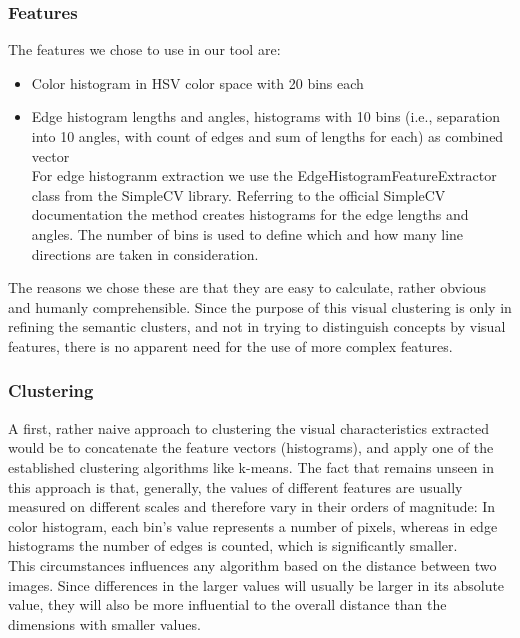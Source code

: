 \subsubsection{Features}
The features we chose to use in our tool are:
\begin{itemize}
\item{Color histogram} in HSV color space with 20 bins each
\item{Edge histogram} lengths and angles, histograms with 10 bins (i.e., separation into 10 angles, with count of edges and sum of lengths for each) as combined vector 
\\
For edge histogranm extraction we use the EdgeHistogramFeatureExtractor class from the SimpleCV library. Referring to the official SimpleCV documentation   the method creates histograms for the edge lengths and angles. The number of bins is used to define which and how many line directions are taken in consideration.
\end{itemize}
The reasons we chose these are that they are easy to calculate, rather obvious and humanly comprehensible. Since the purpose of this visual clustering is only in refining the semantic clusters, and not in trying to distinguish concepts by visual features, there is no apparent need for the use of more complex features. \\


\subsubsection{Clustering}
A first, rather naive approach to clustering the visual characteristics extracted would be to concatenate the feature vectors (histograms), and apply one of the established clustering algorithms like k-means.  The fact that remains unseen in this approach is that, generally, the values of different features are usually measured on different scales and therefore vary in their orders of magnitude: In color histogram, each bin's value represents a number of pixels, whereas in edge histograms the number of edges is counted, which is significantly smaller. \\
This circumstances influences any algorithm based on the distance between two images. Since differences in the larger values will usually be larger in its absolute value, they will also be more influential to the overall distance than the dimensions with smaller values.

